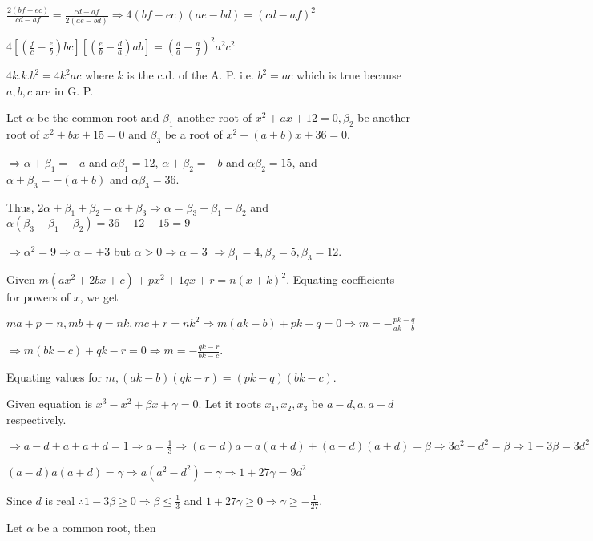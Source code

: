   $\frac{2(bf - ec)}{cd - af} = \frac{cd - af}{2(ae - bd)}\Rightarrow 4(bf - ec)(ae - bd) = (cd - af)^2$

  $4\left[\left(\frac{f}{c} - \frac{e}{b}\right)bc\right]\left[\left(\frac{e}{b} - \frac{d}{a}\right)ab\right]
  = \left(\frac{d}{a} - \frac{a}{f}\right)^2a^2c^2$

  $4k.k.b^2 = 4k^2ac$ where $k$ is the c.d. of the A. P. i.e. $b^2 = ac$ which is true because $a, b, c$ are
  in G. P.
\item Let $\alpha$ be the common root and $\beta_1$ another root of $x^2 + ax + 12 = 0, \beta_2$ be
  another root of $x^2 + bx + 15 = 0$ and $\beta_3$ be a root of $x^2 + (a + b)x + 36 = 0$.

  $\Rightarrow \alpha + \beta_1 = -a$ and $\alpha\beta_1 = 12$, $\alpha + \beta_2 = -b$ and $\alpha\beta_2 =
  15$, and $\alpha + \beta_3 = -(a + b)$ and $\alpha\beta_3 = 36$.

  Thus, $2\alpha + \beta_1 + \beta_2 = \alpha + \beta_3 \Rightarrow \alpha = \beta_3 - \beta_1 - \beta_2$
  and $\alpha(\beta_3 - \beta_1 - \beta_2) = 36 - 12 - 15 = 9$

  $\Rightarrow \alpha^2 = 9 \Rightarrow \alpha = \pm 3$ but $\alpha > 0 \Rightarrow \alpha = 3$
  $\Rightarrow \beta_1 = 4, \beta_2 = 5, \beta_3 = 12$.
\item Given $m(ax^2 + 2bx + c) + px^2 + 1qx + r = n(x + k)^2$. Equating coefficients for powers of $x$, we get

  $ma + p = n, mb + q = nk, mc + r = nk^2\Rightarrow m(ak - b) + pk - q = 0 \Rightarrow m = -\frac{pk - q}{ak - b}$

  $\Rightarrow m(bk - c) + qk - r = 0 \Rightarrow m = -\frac{qk - r}{bk - c}$.

  Equating values for $m, (ak - b)(qk - r) = (pk - q)(bk - c)$.
\item Given equation is $x^3 - x^2 + \beta x + \gamma = 0$. Let it roots $x_1, x_2, x_3$ be $a - d, a, a +
  d$ respectively.

  $\Rightarrow a - d + a + a + d = 1 \Rightarrow a = \frac{1}{3}\Rightarrow (a - d)a + a(a + d) + (a - d)(a +
    d) = \beta \Rightarrow 3a^2 - d^2 = \beta \Rightarrow 1 - 3\beta = 3d^2$

  $(a - d)a(a + d) = \gamma \Rightarrow a(a^2 - d^2) = \gamma \Rightarrow 1 + 27\gamma = 9d^2$

  Since $d$ is real $\therefore 1 - 3\beta \ge 0 \Rightarrow \beta \le \frac{1}{3}$ and $1 + 27\gamma \ge 0
  \Rightarrow \gamma \ge -\frac{1}{27}$.
\item Let $\alpha$ be a common root, then

